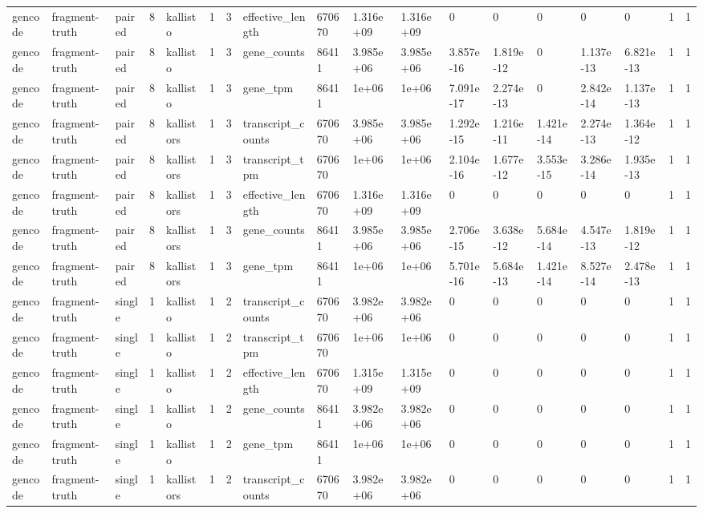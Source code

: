 \begin{tabular}{llllllllllllllllll}
gencode & fragment-truth & paired & 8 & kallisto & 1 & 3 & effective\_length & 670670 & 1.316e+09 & 1.316e+09 & 0 & 0 & 0 & 0 & 0 & 1 & 1 \\
gencode & fragment-truth & paired & 8 & kallisto & 1 & 3 & gene\_counts & 86411 & 3.985e+06 & 3.985e+06 & 3.857e-16 & 1.819e-12 & 0 & 1.137e-13 & 6.821e-13 & 1 & 1 \\
gencode & fragment-truth & paired & 8 & kallisto & 1 & 3 & gene\_tpm & 86411 & 1e+06 & 1e+06 & 7.091e-17 & 2.274e-13 & 0 & 2.842e-14 & 1.137e-13 & 1 & 1 \\
gencode & fragment-truth & paired & 8 & kallistors & 1 & 3 & transcript\_counts & 670670 & 3.985e+06 & 3.985e+06 & 1.292e-15 & 1.216e-11 & 1.421e-14 & 2.274e-13 & 1.364e-12 & 1 & 1 \\
gencode & fragment-truth & paired & 8 & kallistors & 1 & 3 & transcript\_tpm & 670670 & 1e+06 & 1e+06 & 2.104e-16 & 1.677e-12 & 3.553e-15 & 3.286e-14 & 1.935e-13 & 1 & 1 \\
gencode & fragment-truth & paired & 8 & kallistors & 1 & 3 & effective\_length & 670670 & 1.316e+09 & 1.316e+09 & 0 & 0 & 0 & 0 & 0 & 1 & 1 \\
gencode & fragment-truth & paired & 8 & kallistors & 1 & 3 & gene\_counts & 86411 & 3.985e+06 & 3.985e+06 & 2.706e-15 & 3.638e-12 & 5.684e-14 & 4.547e-13 & 1.819e-12 & 1 & 1 \\
gencode & fragment-truth & paired & 8 & kallistors & 1 & 3 & gene\_tpm & 86411 & 1e+06 & 1e+06 & 5.701e-16 & 5.684e-13 & 1.421e-14 & 8.527e-14 & 2.478e-13 & 1 & 1 \\
gencode & fragment-truth & single & 1 & kallisto & 1 & 2 & transcript\_counts & 670670 & 3.982e+06 & 3.982e+06 & 0 & 0 & 0 & 0 & 0 & 1 & 1 \\
gencode & fragment-truth & single & 1 & kallisto & 1 & 2 & transcript\_tpm & 670670 & 1e+06 & 1e+06 & 0 & 0 & 0 & 0 & 0 & 1 & 1 \\
gencode & fragment-truth & single & 1 & kallisto & 1 & 2 & effective\_length & 670670 & 1.315e+09 & 1.315e+09 & 0 & 0 & 0 & 0 & 0 & 1 & 1 \\
gencode & fragment-truth & single & 1 & kallisto & 1 & 2 & gene\_counts & 86411 & 3.982e+06 & 3.982e+06 & 0 & 0 & 0 & 0 & 0 & 1 & 1 \\
gencode & fragment-truth & single & 1 & kallisto & 1 & 2 & gene\_tpm & 86411 & 1e+06 & 1e+06 & 0 & 0 & 0 & 0 & 0 & 1 & 1 \\
gencode & fragment-truth & single & 1 & kallistors & 1 & 2 & transcript\_counts & 670670 & 3.982e+06 & 3.982e+06 & 0 & 0 & 0 & 0 & 0 & 1 & 1 \\

\end{tabular}
